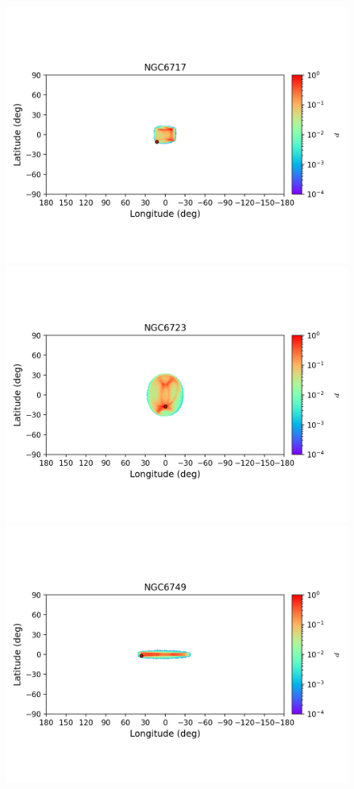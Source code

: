        \begin{figure}
        \includegraphics[clip=true, trim = 0mm 20mm 0mm 10mm, width=1\columnwidth]{images/error_plots_NGC6717.png}
        \includegraphics[clip=true, trim = 0mm 20mm 0mm 10mm, width=1\columnwidth]{images/error_plots_NGC6723.png}
        \includegraphics[clip=true, trim = 0mm 20mm 0mm 10mm, width=1\columnwidth]{images/error_plots_NGC6749.png}

\end{figure}
